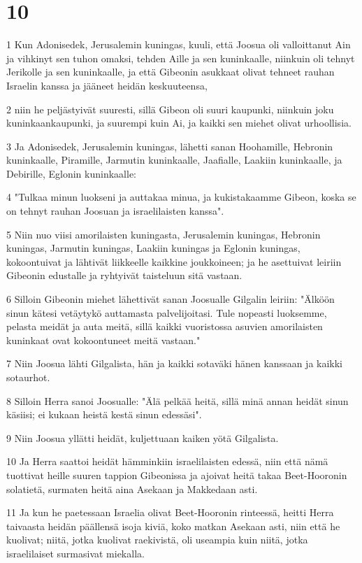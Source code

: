 \chapter{10}

\par 1 Kun Adonisedek, Jerusalemin kuningas, kuuli, että Joosua oli valloittanut Ain ja vihkinyt sen tuhon omaksi, tehden Aille ja sen kuninkaalle, niinkuin oli tehnyt Jerikolle ja sen kuninkaalle, ja että Gibeonin asukkaat olivat tehneet rauhan Israelin kanssa ja jääneet heidän keskuuteensa,
\par 2 niin he peljästyivät suuresti, sillä Gibeon oli suuri kaupunki, niinkuin joku kuninkaankaupunki, ja suurempi kuin Ai, ja kaikki sen miehet olivat urhoollisia.
\par 3 Ja Adonisedek, Jerusalemin kuningas, lähetti sanan Hoohamille, Hebronin kuninkaalle, Piramille, Jarmutin kuninkaalle, Jaafialle, Laakiin kuninkaalle, ja Debirille, Eglonin kuninkaalle:
\par 4 "Tulkaa minun luokseni ja auttakaa minua, ja kukistakaamme Gibeon, koska se on tehnyt rauhan Joosuan ja israelilaisten kanssa".
\par 5 Niin nuo viisi amorilaisten kuningasta, Jerusalemin kuningas, Hebronin kuningas, Jarmutin kuningas, Laakiin kuningas ja Eglonin kuningas, kokoontuivat ja lähtivät liikkeelle kaikkine joukkoineen; ja he asettuivat leiriin Gibeonin edustalle ja ryhtyivät taisteluun sitä vastaan.
\par 6 Silloin Gibeonin miehet lähettivät sanan Joosualle Gilgalin leiriin: "Älköön sinun kätesi vetäytykö auttamasta palvelijoitasi. Tule nopeasti luoksemme, pelasta meidät ja auta meitä, sillä kaikki vuoristossa asuvien amorilaisten kuninkaat ovat kokoontuneet meitä vastaan."
\par 7 Niin Joosua lähti Gilgalista, hän ja kaikki sotaväki hänen kanssaan ja kaikki sotaurhot.
\par 8 Silloin Herra sanoi Joosualle: "Älä pelkää heitä, sillä minä annan heidät sinun käsiisi; ei kukaan heistä kestä sinun edessäsi".
\par 9 Niin Joosua yllätti heidät, kuljettuaan kaiken yötä Gilgalista.
\par 10 Ja Herra saattoi heidät hämminkiin israelilaisten edessä, niin että nämä tuottivat heille suuren tappion Gibeonissa ja ajoivat heitä takaa Beet-Hooronin solatietä, surmaten heitä aina Asekaan ja Makkedaan asti.
\par 11 Ja kun he paetessaan Israelia olivat Beet-Hooronin rinteessä, heitti Herra taivaasta heidän päällensä isoja kiviä, koko matkan Asekaan asti, niin että he kuolivat; niitä, jotka kuolivat raekivistä, oli useampia kuin niitä, jotka israelilaiset surmasivat miekalla.
